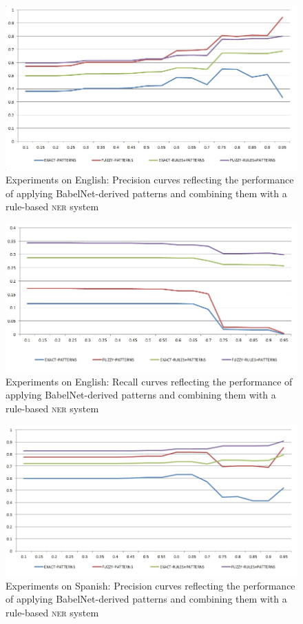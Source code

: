 \documentclass[output=paper]{langsci/langscibook}
\begin{document}
\begin{figure}
\centering
\includegraphics[width=.95\textwidth]{figures/eval_patterns_English_precision.jpg}
\caption{Experiments on English: Precision curves reflecting the performance of applying BabelNet-derived patterns and combining them with a rule-based \textsc{ner} system}
\label{jac:fig:eval_patterns_english_precision}
\end{figure}

\begin{figure}
\centering
\includegraphics[width=.95\textwidth]{figures/eval_patterns_English_recall.jpg}
\caption{Experiments on English: Recall curves reflecting the performance of applying BabelNet-derived patterns and combining them with a rule-based \textsc{ner} system}
\label{jac:fig:eval_patterns_english_recall}
\end{figure}

\begin{figure}
\centering
\includegraphics[width=.95\textwidth]{figures/eval_patterns_Spanish_precision.jpg}
\caption{Experiments on Spanish: Precision curves reflecting the performance of applying BabelNet-derived patterns and combining them with a rule-based \textsc{ner} system}
\label{jac:fig:eval_patterns_spanish_precision}
\end{figure}
\end{document}
